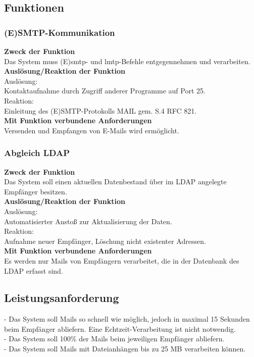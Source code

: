 \subsection{Funktionen}
\subsubsection*{(E)SMTP-Kommunikation}
\textbf{Zweck der Funktion} \\
Das System muss (E)\ac{smtp}- und \ac{lmtp}-Befehle entgegennehmen und verarbeiten. \\
\textbf{Auslösung/Reaktion der Funktion} \\
Auslösung: \\
Kontaktaufnahme durch Zugriff anderer Programme auf Port 25.\\
Reaktion:\\
Einleitung des (E)SMTP-Protokolls MAIL gem. S.4 RFC 821. \\
\textbf{Mit Funktion verbundene Anforderungen} \\
Versenden und Empfangen von E-Mails wird ermöglicht.\\
\subsubsection*{Abgleich LDAP}
\textbf{Zweck der Funktion} \\
Das System soll einen aktuellen Datenbestand über im LDAP angelegte Empfänger besitzen.\\
\textbf{Auslösung/Reaktion der Funktion} \\
Auslösung:\\
Automatisierter Anstoß zur Aktualisierung der Daten.\\
Reaktion:\\
Aufnahme neuer Empfänger, Löschung  nicht existenter Adressen.\\
\textbf{Mit Funktion verbundene Anforderungen}\\
Es werden nur Mails von Empfängern verarbeitet, die in der Datenbank des LDAP erfasst sind.\\
\subsection{Leistungsanforderung}
- Das System soll Mails so schnell wie möglich, jedoch in maximal 15 Sekunden beim Empfänger abliefern. Eine Echtzeit-Verarbeitung ist nicht notwendig.\\
- Das System soll 100\% der Mails beim jeweiligen Empfänger abliefern.\\
- Das System soll Mails mit Dateianhängen bis zu 25 MB verarbeiten können.\\
